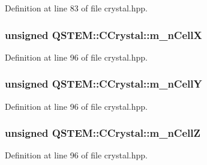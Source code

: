 Definition at line 83 of file crystal.\-hpp.

\hypertarget{class_q_s_t_e_m_1_1_c_crystal_a7b8f359287cd61eef0dcd170c4e09585}{
\subsubsection[{m\-\_\-n\-Cell\-X}]{\setlength{\rightskip}{0pt plus 5cm}unsigned Q\-S\-T\-E\-M\-::\-C\-Crystal\-::m\-\_\-n\-Cell\-X\hspace{0.3cm}{\ttfamily [protected]}}}\label{class_q_s_t_e_m_1_1_c_crystal_a7b8f359287cd61eef0dcd170c4e09585}


Definition at line 96 of file crystal.\-hpp.

\hypertarget{class_q_s_t_e_m_1_1_c_crystal_a468ef22a3bc97734eede8356daef701e}{
\subsubsection[{m\-\_\-n\-Cell\-Y}]{\setlength{\rightskip}{0pt plus 5cm}unsigned Q\-S\-T\-E\-M\-::\-C\-Crystal\-::m\-\_\-n\-Cell\-Y\hspace{0.3cm}{\ttfamily [protected]}}}\label{class_q_s_t_e_m_1_1_c_crystal_a468ef22a3bc97734eede8356daef701e}


Definition at line 96 of file crystal.\-hpp.

\hypertarget{class_q_s_t_e_m_1_1_c_crystal_a047bad8b5c71632c8227ae1e927a3be5}{
\subsubsection[{m\-\_\-n\-Cell\-Z}]{\setlength{\rightskip}{0pt plus 5cm}unsigned Q\-S\-T\-E\-M\-::\-C\-Crystal\-::m\-\_\-n\-Cell\-Z\hspace{0.3cm}{\ttfamily [protected]}}}\label{class_q_s_t_e_m_1_1_c_crystal_a047bad8b5c71632c8227ae1e927a3be5}


Definition at line 96 of file crystal.\-hpp.

